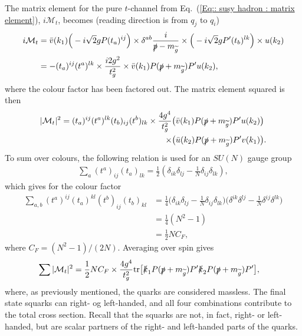 \documentclass[twoside,english]{uiofysmaster}
\begin{document}
{The matrix element for the pure $t$-channel from Eq.~(\ref{Eq:: susy hadron : matrix element}), $i\mathcal{M}_t$, becomes (reading direction is from $q_j$ to $q_i$)
\begin{align*}
i \mathcal{M}_t &= \bar{v} (k_1) \Big( -i \sqrt{2} g P (t_a)^{ij}\Big) \times \delta^{ab} \frac{i}{\slashed{p} - m_{\widetilde{g}}} \times \Big( -i \sqrt{2} gP'(t_b)^{lk} \Big) \times u(k_2)\\
&= - (t_a)^{ij}(t^a)^{lk} \times \frac{i 2 g^2}{t_g^2} \times  \bar{v} (k_1)  P (\slashed{p} + m_{\widetilde{g}}) P' u(k_2) ,
\end{align*}
where the colour factor has been factored out. The matrix element squared is then
\begin{align*}
|\mathcal{M}_t|^2 =  (t_a)^{ij} (t^a)^{lk} (t_b)_{ij} (t^b)_{lk} \times \frac{4 g^4}{t_g^2}&
\big( \bar{v} (k_1)  P (\slashed{p} + m_{\widetilde{g}}) P' u(k_2) \big)
\\ \times &\big( \bar{u} (k_2)  P (\slashed{p} + m_{\widetilde{g}}) P' v(k_1) \big).
\end{align*}
To sum over colours, the following relation is used for an $SU(N)$ gauge group \cite{Ellis:1991qj}
\begin{align}\label{Eq:: susy hadron : color factor identity}
\sum_a (t^a)_{ij} (t_a)_{lk} = \frac{1}{2} (\delta_{ik} \delta_{lj} - \frac{1}{N} \delta_{ij} \delta_{lk}),
\end{align}
which gives for the colour factor
\begin{align*}
\sum_{a,b} (t^a)^{ij}(t_a)^{kl}(t^b)_{ij}(t_b)_{kl} &= \frac{1}{4} 
\big(\delta_{ik} \delta_{lj} - \frac{1}{N} \delta_{ij} \delta_{lk} \big)
\big(\delta^{ik} \delta^{lj} - \frac{1}{N} \delta^{ij} \delta^{lk} \big)\\& = \frac{1}{4} (N^2 - 1)\\& = \frac{1}{2}NC_F,
\end{align*}
where $C_F = (N^2 - 1)/(2N)$. Averaging over spin gives
\begin{align*}
\sum |\mathcal{M}_t|^2 &= \frac{1}{2} NC_F \times \frac{4 g^4}{t_g^2} \text{tr} \big[ 
\slashed{k}_1 P (\slashed{p} + m_{\widetilde{g}}) P' \slashed{k}_2 P (\slashed{p} + m_{\widetilde{g}}) P' \big],
\end{align*}
where, as previously mentioned, the quarks are considered massless. The final state squarks can right- og left-handed, and all four combinations contribute to the total cross section. Recall that the squarks are not, in fact, right- or left-handed, but are scalar partners of the right- and left-handed parts of the quarks. 

}
\end{document}
